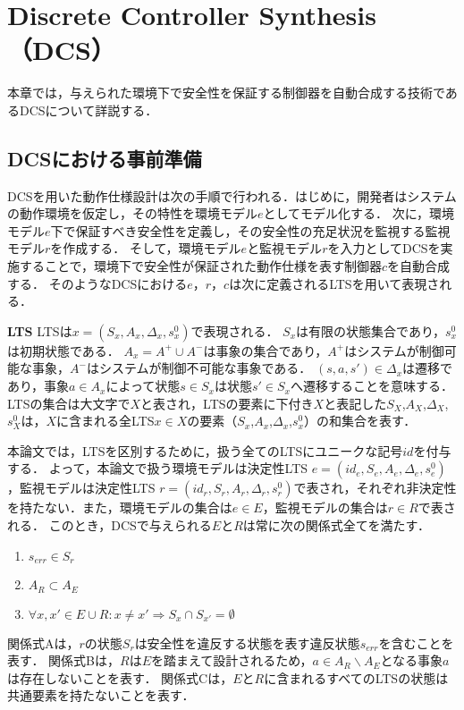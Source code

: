 \section{Discrete Controller Synthesis（DCS）}
\label{section:DCS}
本章では，与えられた環境下で安全性を保証する制御器を自動合成する技術であるDCSについて詳説する．

\subsection{DCSにおける事前準備}
\label{subsection:preparation}
DCSを用いた動作仕様設計は次の手順で行われる．はじめに，開発者はシステムの動作環境を仮定し，その特性を環境モデル$e$としてモデル化する．
次に，環境モデル$e$下で保証すべき安全性を定義し，その安全性の充足状況を監視する監視モデル$r$を作成する．
そして，環境モデル$e$と監視モデル$r$を入力としてDCSを実施することで，環境下で安全性が保証された動作仕様を表す制御器$c$を自動合成する．
そのようなDCSにおける$e$，$r$，$c$は次に定義されるLTSを用いて表現される．

\begin{dfn}{\textbf{LTS}}
\label{def:component_model}
    LTSは$x = (S_{x}, A_{x}, \Delta_{x}, s^0_{x})$で表現される．
    $S_{x}$は有限の状態集合であり，$s^0_{x}$は初期状態である．
    $A_{x} = A^+ \cup A^-$は事象の集合であり，$A^+$はシステムが制御可能な事象，$A^-$はシステムが制御不可能な事象である．
    $(s,a,s') \in \Delta_{x}$は遷移であり，事象$a \in A_{x}$によって状態$s \in S_{x}$は状態$s' \in S_{x}$へ遷移することを意味する．
    LTSの集合は大文字で$X$と表され，LTSの要素に下付き$X$と表記した$S_{X}$,$A_{X}$,$\Delta_{X}$,$s^0_{X}$は，$X$に含まれる全LTS$x \in X$の要素（$S_{x}$,$A_{x}$,$\Delta_{x}$,$s^0_{x}$）の和集合を表す．
\end{dfn}

本論文では，LTSを区別するために，扱う全てのLTSにユニークな記号$id$を付与する．
よって，本論文で扱う環境モデルは決定性LTS $e = (id_{e}, S_{e}, A_{e}, \Delta_{e}, s^0_{e})$，監視モデルは決定性LTS $r = (id_{r}, S_{r}, A_{r}, \Delta_{r}, s^0_{r})$で表され，それぞれ非決定性を持たない．また，環境モデルの集合は$e \in E$，監視モデルの集合は$r \in R$で表される．
このとき，DCSで与えられる$E$と$R$は常に次の関係式全てを満たす．
\begin{enumerate}[\bf 関係式A]
\item $s_{err} \in S_{r}$
\item $A_{R} \subset A_{E}$
\item $\forall x, x' \in E \cup R:  x \neq x'  \Rightarrow S_x \cap S_{x'} = \emptyset$
\end{enumerate}
関係式Aは，$r$の状態$S_{r}$は安全性を違反する状態を表す違反状態$s_{err}$を含むことを表す．
関係式Bは，$R$は$E$を踏まえて設計されるため，$a \in A_{R} \backslash A_{E}$となる事象$a$は存在しないことを表す．
関係式Cは，$E$と$R$に含まれるすべてのLTSの状態は共通要素を持たないことを表す．

